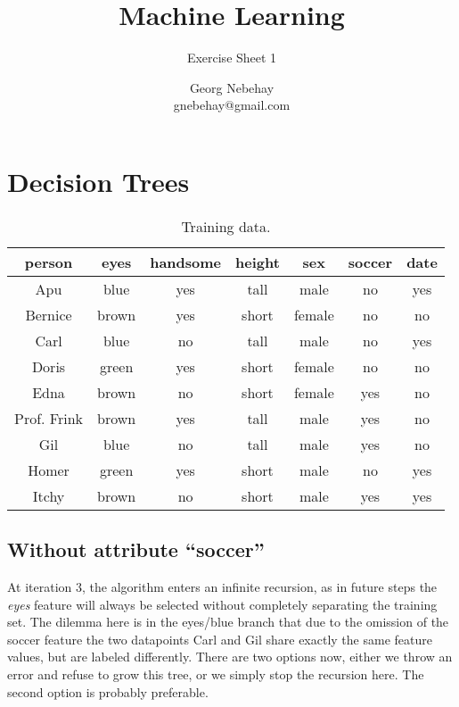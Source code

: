 \documentclass{scrartcl}
\title{Machine Learning}
\subtitle{Exercise Sheet 1}
\author{Georg Nebehay\\gnebehay@gmail.com}
\date{}
\begin{document}
\maketitle

\section{Decision Trees}

\begin{table}[h!]
  \centering
  \begin{tabular}{cccccc|c}
    \toprule
    person      & eyes  & handsome & height & sex    & soccer & date\\
    \midrule
    Apu         & blue  & yes      & tall   & male   & no     & yes \\
    Bernice     & brown & yes      & short  & female & no     & no  \\
    Carl        & blue  & no       & tall   & male   & no     & yes \\
    Doris       & green & yes      & short  & female & no     & no  \\
    Edna        & brown & no       & short  & female & yes    & no  \\
    Prof. Frink & brown & yes      & tall   & male   & yes    & no  \\
    Gil         & blue  & no       & tall   & male   & yes    & no  \\
    Homer       & green & yes      & short  & male   & no     & yes \\
    Itchy       & brown & no       & short  & male   & yes    & yes \\
    \bottomrule
  \end{tabular}
  \caption{Training data.}
\end{table}

\subsection{Without attribute ``soccer''}
At iteration 3, the algorithm enters an infinite recursion,
    as in future steps the \textit{eyes} feature will always be selected
    without completely separating the training set.
    The dilemma here is in the eyes/blue branch that due to the omission of the soccer feature the two datapoints Carl and Gil share exactly the same feature values, but are labeled differently.
    There are two options now, either we throw an error and refuse to grow this tree, or we simply stop the recursion here. The second option is probably preferable.

\end{document}
